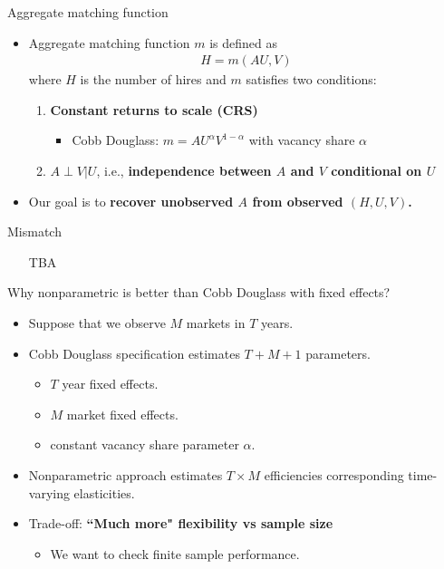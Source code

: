 \documentclass[aspectratio=169]{beamer}
\begin{document}
\begin{frame}{Aggregate matching function}
\begin{itemize}
    \item Aggregate matching function $m$ is defined as
    \begin{align*}
        H=m(AU,V)
    \end{align*}
    where $H$ is the number of hires and $m$ satisfies two conditions:
    \begin{enumerate}
        \item \textbf{Constant returns to scale (CRS)}
        \begin{itemize}
            \item Cobb Douglass: $m=AU^{\alpha}V^{1-\alpha}$ with vacancy share $\alpha$
        \end{itemize}
        \item $A\perp V|U$, i.e., \textbf{independence between $A$ and $V$ conditional on $U$}
    \end{enumerate}
    
        \item Our goal is to \textbf{recover unobserved $A$ from observed $(H,U,V)$.}
\end{itemize}
    
\end{frame}

\begin{frame}{Mismatch}
    \begin{itemize}
    \item [TBA]
\end{itemize}
\end{frame}


\begin{frame}{Why nonparametric is better than Cobb Douglass with fixed effects?}
\begin{itemize}
    \item Suppose that we observe $M$ markets in $T$ years.
    \item Cobb Douglass specification estimates $T+M+1$ parameters.
    \begin{itemize}
        \item $T$ year fixed effects.
        \item $M$ market fixed effects.
        \item constant vacancy share parameter $\alpha$.
    \end{itemize}
    \item Nonparametric approach estimates $T\times M$ efficiencies corresponding time-varying elasticities.
    \item Trade-off: \textbf{``Much more" flexibility vs sample size}
    \begin{itemize}
        \item We want to check finite sample performance.
    \end{itemize}
\end{itemize}
    
\end{frame}
\end{document}
